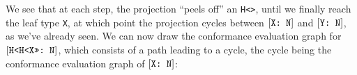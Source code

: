 \documentclass[../generics]{subfiles}
\begin{document}
We see that at each step, the projection ``peels off'' an \texttt{H<>}, until we finally reach the leaf type \verb|X|, at which point the projection cycles between $[\texttt{X:~N}]$ and $[\texttt{Y:~N}]$, as we've already seen. We can now draw the conformance evaluation graph for $[\texttt{H<H<X>>:~N}]$, which consists of a path leading to a cycle, the cycle being the conformance evaluation graph of $[\texttt{X:~N}]$:
\begin{center}
\end{center}
\end{document}
